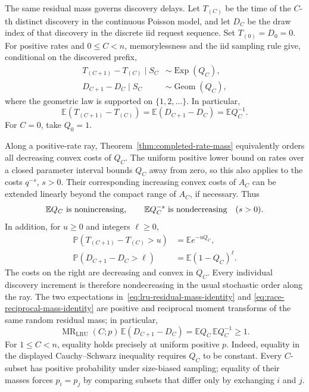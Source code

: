 \documentclass[11pt]{article}
\theoremstyle{definition}
\theoremstyle{remark}
\newcommand{\E}{\mathbb E}
\newcommand{\Pbb}{\mathbb P}
\newcommand{\1}{\mathbf 1}
\begin{document}
The same residual mass governs discovery delays.  Let \(T_{(C)}\)
be the time of the \(C\)-th distinct discovery in the continuous
Poisson model, and let \(D_C\) be the draw index of that discovery
in the discrete iid request sequence.  Set \(T_{(0)}=D_0=0\).
For positive rates and \(0\le C<n\), memorylessness and the iid
sampling rule give, conditional on the discovered prefix,
\begin{align}
  T_{(C+1)}-T_{(C)}\mid S_C
     &\sim\operatorname{Exp}(Q_C),
     \label{eq:race-exponential-gap}\\
  D_{C+1}-D_C\mid S_C
     &\sim\operatorname{Geom}(Q_C),
     \label{eq:race-geometric-gap}
\end{align}
where the geometric law is supported on \(\{1,2,\ldots\}\).
In particular,
\begin{equation}\label{eq:race-reciprocal-mass-identity}
  \E(T_{(C+1)}-T_{(C)})
  =\E(D_{C+1}-D_C)=\E Q_C^{-1}.
\end{equation}
For \(C=0\), take \(Q_0=1\).

Along a positive-rate ray, Theorem~\ref{thm:completed-rate-mass}
equivalently orders all decreasing convex costs of \(Q_C\).
The uniform positive lower bound on rates over a closed parameter
interval bounds \(Q_C\) away from zero, so this also applies to
the costs \(q^{-s}\), \(s>0\).  Their corresponding increasing
convex costs of \(A_C\) can be extended linearly beyond the compact
range of \(A_C\), if necessary.  Thus
\begin{equation}\label{eq:race-residual-transform-orders}
  \E Q_C\ \hbox{is nonincreasing},\qquad
  \E Q_C^{-s}\ \hbox{is nondecreasing}\quad(s>0).
\end{equation}
In addition, for \(u\ge0\) and integers \(\ell\ge0\),
\begin{align*}
  \Pbb(T_{(C+1)}-T_{(C)}>u)&=\E e^{-uQ_C},\\
  \Pbb(D_{C+1}-D_C>\ell)&=\E(1-Q_C)^\ell.
\end{align*}
The costs on the right are decreasing and convex in \(Q_C\).
Every individual discovery increment is therefore nondecreasing
in the usual stochastic order along the ray.  The two expectations
in~\eqref{eq:lru-residual-mass-identity} and
\eqref{eq:race-reciprocal-mass-identity} are positive and reciprocal
moment transforms of the same random residual mass; in particular,
\[
  \operatorname{MR}_{\mathrm{LRU}}(C;p)
  \,\E(D_{C+1}-D_C)
  =\E Q_C\,\E Q_C^{-1}\ge1.
\]
For \(1\le C<n\), equality holds precisely at uniform positive
\(p\).  Indeed, equality in the displayed Cauchy--Schwarz
inequality requires \(Q_C\) to be constant.  Every \(C\)-subset
has positive probability under size-biased sampling; equality of
their masses forces \(p_i=p_j\) by comparing subsets that differ
only by exchanging \(i\) and \(j\).
\end{document}
